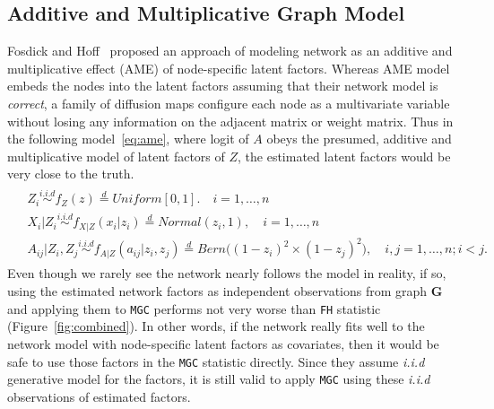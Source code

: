 \documentclass[11pt]{article}
\theoremstyle{definition}
\begin{document}
	\subsection{Additive and Multiplicative Graph Model}
	\label{ssec:ame}
	
	Fosdick and Hoff~\cite{fosdick2015testing} proposed an approach of modeling network as an additive and multiplicative effect (AME) of node-specific latent factors. Whereas AME model embeds the nodes into the latent factors assuming that their network model is \textit{correct}, a family of diffusion maps configure each node as a multivariate variable without losing any information on the adjacent matrix or weight matrix. Thus in the following model~\ref{eq:ame}, where logit of $A$ obeys the presumed, additive and multiplicative model of latent factors of $Z$, the estimated latent factors would be very close to the truth. 
	\begin{equation}
	\label{eq:ame}
	\begin{gathered}
	\begin{aligned}
	&	Z_{i} \overset{i.i.d}{\sim} f_{Z}(z) \stackrel{d}{=} Uniform[0,1]. \quad i = 1, \ldots, n \\ 
	&	X_{i} | Z_{i} \overset{i.i.d}{\sim}  f_{X|Z}(x_{i} | z_{i}) \stackrel{d}{=}  Normal(z_{i}, 1), \quad i= 1, \ldots, n \\
	&	A_{ij} | Z_{i}, Z_{j} \overset{i.i.d}{\sim}  f_{A|Z}(a_{ij} | z_{i}, z_{j}) \stackrel{d}{=}   Bern \big(  ( 1 - z_{i})^2 \times (1 - z_{j})^2    \big), \quad i,j = 1, \ldots, n;  i < j.
	\end{aligned}
	\end{gathered}
	\end{equation}	
	Even though we rarely see the network nearly follows the model in reality, if so, using the estimated network factors as independent observations from graph \textbf{G} and applying them to \texttt{MGC} performs not very worse than \texttt{FH} statistic (Figure~\ref{fig:combined}). In other words, if the network really fits well to the network model with node-specific latent factors as covariates, then it would be safe to use those factors in the \texttt{MGC} statistic directly. Since they assume \textit{i.i.d} generative model for the factors, it is still valid to apply \texttt{MGC} using these \textit{i.i.d} observations of estimated factors.
	
	
\end{document}
